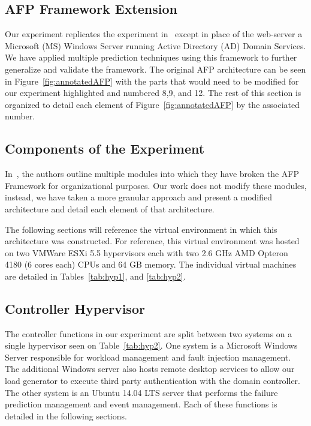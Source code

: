\subsection{AFP Framework Extension}
Our experiment replicates the experiment in~\cite{irrera2015} except in place
of the web-server a Microsoft (MS) Windows Server running Active Directory (AD)
Domain Services.  We have applied multiple prediction techniques using this
framework to further generalize and validate the framework.  The original AFP
architecture can be seen in Figure~\ref{fig:annotatedAFP} with the parts that
would need to be modified for our experiment highlighted and numbered 8,9, and
12.  The rest of this section is organized to detail each element of
Figure~\ref{fig:annotatedAFP} by the associated number.

\subsection{Components of the Experiment}
In~\cite{irrera2015}, the authors outline multiple modules into which they have
broken the AFP Framework for organizational purposes.  Our work does not modify
these modules, instead, we have taken a more granular approach and present a
modified architecture and detail each element of that architecture.

\figannotatedAFP  

The following sections will reference the virtual environment in which this
architecture was constructed.  For reference, this virtual environment was
hosted on two VMWare ESXi 5.5 hypervisors each with two 2.6 GHz AMD Opteron
4180 (6 cores each) CPUs and 64 GB memory.  The individual virtual machines are
detailed in Tables~\ref{tab:hyp1}, and \ref{tab:hyp2}.

\tabHypervisorOne
\tabHypervisorTwo

\setcounter{secnumdepth}{5}

\subsection{Controller Hypervisor} \label{sec:controller} %
The controller functions in our experiment are split between two systems on a
single hypervisor seen on Table~\ref{tab:hyp2}.  One system is a Microsoft
Windows Server responsible for workload management and fault injection
management.  The additional Windows server also hosts remote desktop services
to allow our load generator to execute third party authentication with the
domain controller.  The other system is an Ubuntu 14.04 LTS server that
performs the failure prediction management and event management.  Each of
these functions is detailed in the following sections.

